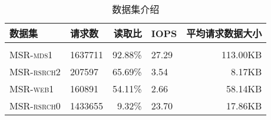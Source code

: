 \begin{table}[htbp]
	\centering
	\caption{数据集介绍}
	\begin{tabular}{llrlr}
		\toprule
		\textsc{数据集}     & 请求数    & 读取比    & IOPS    & 平均请求数据大小    \\[1pt]
		\midrule
		\\[-15pt]
		\textsc{MSR-mds1}                      & 1637711              & 92.88\%              & 27.29           & 113.00KB     \\
		\textsc{MSR-rsrch2}                      & 207597              & 65.69\%               & 3.54           & 8.17KB           \\
		\textsc{MSR-web1}                      & 160891              & 54.11\%               & 2.66           & 58.14KB           \\
		\textsc{MSR-rsrch0}                      & 1433655              & 9.32\%              & 23.70           & 17.86KB       \\
		\bottomrule
	\end{tabular}
	\label{table:4-3}
\end{table}

